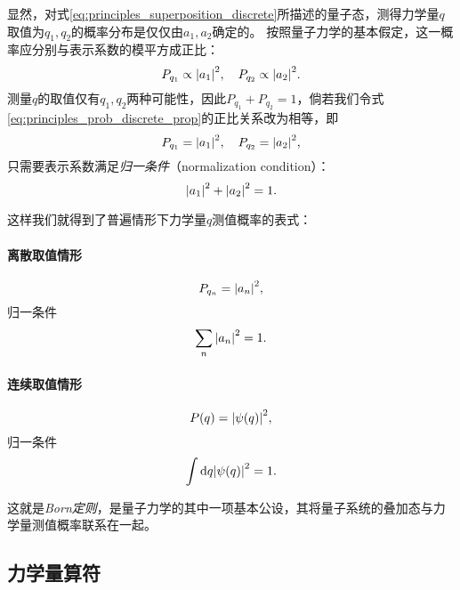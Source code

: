 显然，对式\eqref{eq:principles_superposition_discrete}所描述的量子态，测得力学量$q$取值为$q_1, q_2$的概率分布是仅仅由$a_1, a_2$确定的。
按照量子力学的基本假定，这一概率应分别与表示系数的模平方成正比：
\begin{equation}
    \label{eq:principles_prob_discrete_prop}
    P_{q_1} \propto \abs{a_1}^2, \quad P_{q_2} \propto \abs{a_2}^2.
\end{equation}
测量$q$的取值仅有$q_1, q_2$两种可能性，因此$P_{q_1}+P_{q_2}=1$，倘若我们令式\eqref{eq:principles_prob_discrete_prop}的正比关系改为相等，即
\begin{equation}
    \label{eq:principles_prob_discrete}
    P_{q_1} = \abs{a_1}^2, \quad P_{q_2} = \abs{a_2}^2,
\end{equation}
只需要表示系数满足\emph{归一条件}（normalization condition）：
\begin{equation}
    \label{eq:principles_norm_discrete}
    \abs{a_1}^2 + \abs{a_2}^2 = 1.
\end{equation}

这样我们就得到了普遍情形下力学量$q$测值概率的表式：
\begin{tcolorbox}

\paragraph{离散取值情形}
\begin{equation}
    P_{q_n} = \abs{a_n}^2,
\end{equation}
归一条件
\begin{equation}
    \sum_n{\abs{a_n}^2} = 1.
\end{equation}

\paragraph{连续取值情形}
\begin{equation}
    P(q) = \abs{\psi(q)}^2,
\end{equation}
归一条件
\begin{equation}
    \int \dd q \abs{\psi(q)}^2 = 1.
\end{equation}

\end{tcolorbox}

这就是\emph{Born定则}，是量子力学的其中一项基本公设，其将量子系统的叠加态与力学量测值概率联系在一起。


\subsection{力学量算符}
\label{subsec:principles_operator}


